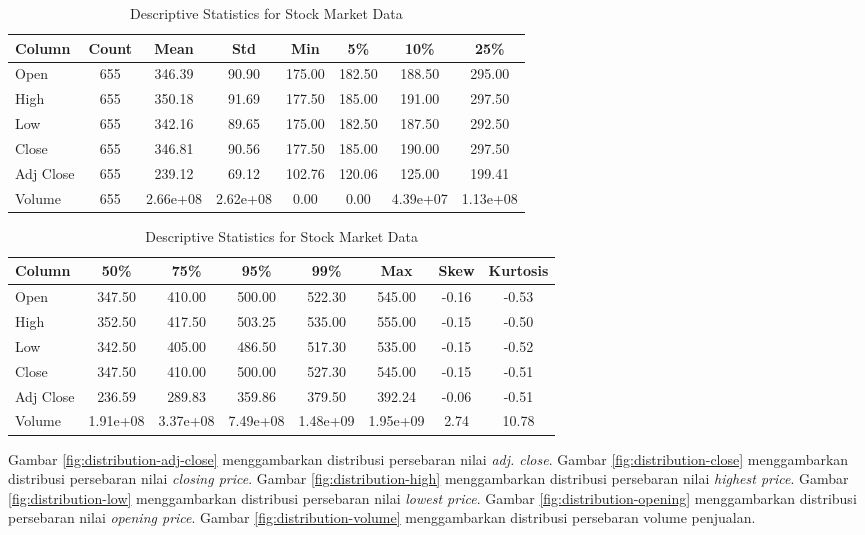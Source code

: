 \begin{table}[H]
\caption{Descriptive Statistics for Stock Market Data}
\label{table:descriptive_statistics}
\begin{tabular}{|l|c|c|c|c|c|c|c|}
\hline
\textbf{Column} & \textbf{Count} & \textbf{Mean} & \textbf{Std} & \textbf{Min} & \textbf{5\%} & \textbf{10\%} & \textbf{25\%} \\ \hline
Open & 655 & 346.39 & 90.90 & 175.00 & 182.50 & 188.50 & 295.00 \\ \hline
High & 655 & 350.18 & 91.69 & 177.50 & 185.00 & 191.00 & 297.50 \\ \hline
Low & 655 & 342.16 & 89.65 & 175.00 & 182.50 & 187.50 & 292.50 \\ \hline
Close & 655 & 346.81 & 90.56 & 177.50 & 185.00 & 190.00 & 297.50 \\ \hline
Adj Close & 655 & 239.12 & 69.12 & 102.76 & 120.06 & 125.00 & 199.41 \\ \hline
Volume & 655 & 2.66e+08 & 2.62e+08 & 0.00 & 0.00 & 4.39e+07 & 1.13e+08 \\ \hline
\end{tabular}

\vspace{0.5cm}

\begin{tabular}{|l|c|c|c|c|c|c|c|}
\hline
\textbf{Column} & \textbf{50\%} & \textbf{75\%} & \textbf{95\%} & \textbf{99\%} & \textbf{Max} & \textbf{Skew} & \textbf{Kurtosis} \\ \hline
Open & 347.50 & 410.00 & 500.00 & 522.30 & 545.00 & -0.16 & -0.53 \\ \hline
High & 352.50 & 417.50 & 503.25 & 535.00 & 555.00 & -0.15 & -0.50 \\ \hline
Low & 342.50 & 405.00 & 486.50 & 517.30 & 535.00 & -0.15 & -0.52 \\ \hline
Close & 347.50 & 410.00 & 500.00 & 527.30 & 545.00 & -0.15 & -0.51 \\ \hline
Adj Close & 236.59 & 289.83 & 359.86 & 379.50 & 392.24 & -0.06 & -0.51 \\ \hline
Volume & 1.91e+08 & 3.37e+08 & 7.49e+08 & 1.48e+09 & 1.95e+09 & 2.74 & 10.78 \\ \hline
\end{tabular}
\end{table}


Gambar \ref{fig:distribution-adj-close} menggambarkan distribusi persebaran nilai \textit{adj. close}. Gambar \ref{fig:distribution-close} menggambarkan distribusi persebaran nilai \textit{closing price}.
Gambar \ref{fig:distribution-high} menggambarkan distribusi persebaran nilai \textit{highest price}.
Gambar \ref{fig:distribution-low} menggambarkan distribusi persebaran nilai \textit{lowest price}.
Gambar \ref{fig:distribution-opening} menggambarkan distribusi persebaran nilai \textit{opening price}.
Gambar \ref{fig:distribution-volume} menggambarkan distribusi persebaran volume penjualan.


